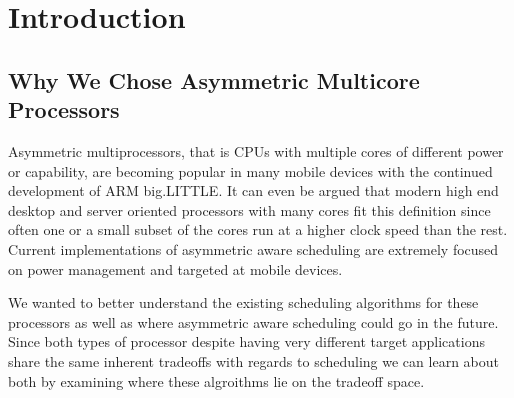 \section{Introduction}
\subsection{Why We Chose Asymmetric Multicore Processors}
Asymmetric multiprocessors, that is CPUs with multiple cores of different power or capability, are becoming popular in many mobile devices with the continued development of ARM big.LITTLE.
It can even be argued that modern high end desktop and server oriented processors with many cores fit this definition since often one or a small subset of the cores run at a higher clock speed than the rest. 
Current implementations of asymmetric aware scheduling are extremely focused on power management and targeted at mobile devices.

We wanted to better understand the existing scheduling algorithms for these processors as well as where asymmetric aware scheduling could go in the future.
Since both types of processor despite having very different target applications share the same inherent tradeoffs with regards to scheduling we can learn about both by examining where these algroithms lie on the tradeoff space.